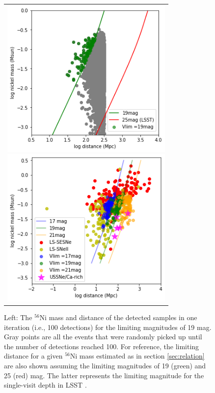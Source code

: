 \documentclass[twocolumn, linenumbers]{aastex62}
\begin{document}
\begin{figure}[htbp]
 \begin{center}
    \begin{tabular}{c}
    \begin{minipage}{0.5\hsize}
    \begin{center}
      \includegraphics[width=85mm]{Ni_vs_distance_wt_mock_no_obs_data.png}
    \end{center}
  \end{minipage}
  \begin{minipage}{0.5\hsize}
    \begin{center}
       \includegraphics[width=85mm]{Ni_vs_distance_wt_mock.png}
    \end{center}
  \end{minipage}
  \end{tabular}
 \end{center}
 \caption{Left: The $^{56}$Ni mass and distance of the detected samples in one iteration (i.e., 100 detections) for the limiting magnitudes of 19 mag. Gray points are all the events that were randomly picked up until the number of detections reached 100. For reference, the limiting distance for a given $^{56}$Ni mass estimated as in section \ref{sec:relation} are also shown assuming the limiting magnitudes of 19 (green) and 25 (red) mag. The latter represents the limiting magnitude for the single-visit depth in LSST \citep{2019ApJ...873..111I}.
}
\end{figure}
\end{document}
